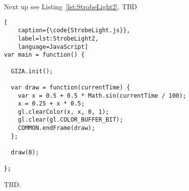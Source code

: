 Next up see Listing~\ref{lst:StrobeLight2}.  TBD

\begin{lstlisting}[
    caption={\code{StrobeLight.js}},
    label=lst:StrobeLight2,
    language=JavaScript]
var main = function() {

  GIZA.init();

  var draw = function(currentTime) {
    var x = 0.5 + 0.5 * Math.sin(currentTime / 100);
    x = 0.25 + x * 0.5;
    gl.clearColor(x, x, 0, 1);
    gl.clear(gl.COLOR_BUFFER_BIT);
    COMMON.endFrame(draw);
  };

  draw(0);

};
\end{lstlisting} 

TBD.